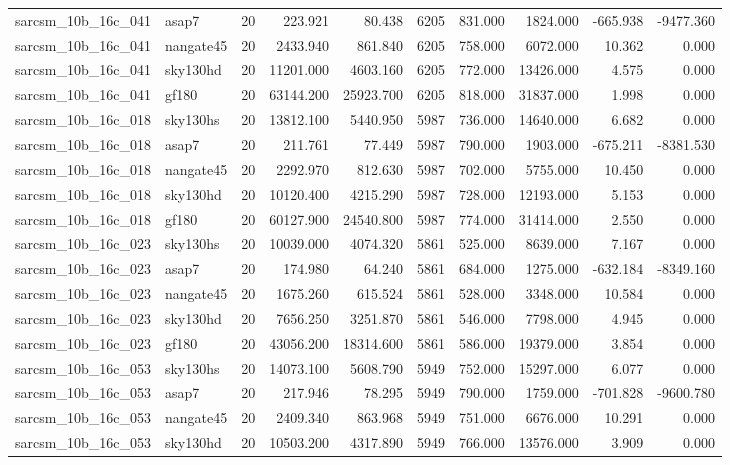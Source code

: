 \documentclass{article}
\begin{document}
\begin{longtable}{llrrrrrrrr}
sarcsm\_10b\_16c\_041 & asap7 & 20 & 223.921 & 80.438 & 6205 & 831.000 & 1824.000 & -665.938 & -9477.360 \\
sarcsm\_10b\_16c\_041 & nangate45 & 20 & 2433.940 & 861.840 & 6205 & 758.000 & 6072.000 & 10.362 & 0.000 \\
sarcsm\_10b\_16c\_041 & sky130hd & 20 & 11201.000 & 4603.160 & 6205 & 772.000 & 13426.000 & 4.575 & 0.000 \\
sarcsm\_10b\_16c\_041 & gf180 & 20 & 63144.200 & 25923.700 & 6205 & 818.000 & 31837.000 & 1.998 & 0.000 \\
sarcsm\_10b\_16c\_018 & sky130hs & 20 & 13812.100 & 5440.950 & 5987 & 736.000 & 14640.000 & 6.682 & 0.000 \\
sarcsm\_10b\_16c\_018 & asap7 & 20 & 211.761 & 77.449 & 5987 & 790.000 & 1903.000 & -675.211 & -8381.530 \\
sarcsm\_10b\_16c\_018 & nangate45 & 20 & 2292.970 & 812.630 & 5987 & 702.000 & 5755.000 & 10.450 & 0.000 \\
sarcsm\_10b\_16c\_018 & sky130hd & 20 & 10120.400 & 4215.290 & 5987 & 728.000 & 12193.000 & 5.153 & 0.000 \\
sarcsm\_10b\_16c\_018 & gf180 & 20 & 60127.900 & 24540.800 & 5987 & 774.000 & 31414.000 & 2.550 & 0.000 \\
sarcsm\_10b\_16c\_023 & sky130hs & 20 & 10039.000 & 4074.320 & 5861 & 525.000 & 8639.000 & 7.167 & 0.000 \\
sarcsm\_10b\_16c\_023 & asap7 & 20 & 174.980 & 64.240 & 5861 & 684.000 & 1275.000 & -632.184 & -8349.160 \\
sarcsm\_10b\_16c\_023 & nangate45 & 20 & 1675.260 & 615.524 & 5861 & 528.000 & 3348.000 & 10.584 & 0.000 \\
sarcsm\_10b\_16c\_023 & sky130hd & 20 & 7656.250 & 3251.870 & 5861 & 546.000 & 7798.000 & 4.945 & 0.000 \\
sarcsm\_10b\_16c\_023 & gf180 & 20 & 43056.200 & 18314.600 & 5861 & 586.000 & 19379.000 & 3.854 & 0.000 \\
sarcsm\_10b\_16c\_053 & sky130hs & 20 & 14073.100 & 5608.790 & 5949 & 752.000 & 15297.000 & 6.077 & 0.000 \\
sarcsm\_10b\_16c\_053 & asap7 & 20 & 217.946 & 78.295 & 5949 & 790.000 & 1759.000 & -701.828 & -9600.780 \\
sarcsm\_10b\_16c\_053 & nangate45 & 20 & 2409.340 & 863.968 & 5949 & 751.000 & 6676.000 & 10.291 & 0.000 \\
sarcsm\_10b\_16c\_053 & sky130hd & 20 & 10503.200 & 4317.890 & 5949 & 766.000 & 13576.000 & 3.909 & 0.000 \\

\end{longtable}
\end{document}
